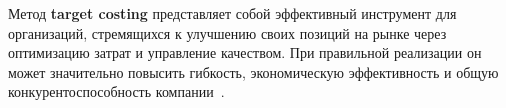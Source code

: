 Метод \textbf{target costing} представляет собой эффективный инструмент для организаций, стремящихся к улучшению своих позиций на рынке через оптимизацию затрат и управление качеством. При правильной реализации он может значительно повысить гибкость, экономическую эффективность и общую конкурентоспособность компании~\cite{target}.

